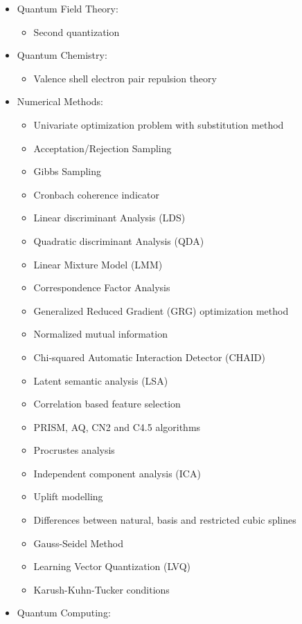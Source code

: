 \begin{itemize}
		\item Quantum Field Theory:
			\begin{itemize}
				\item Second quantization
			\end{itemize}
		\item Quantum Chemistry:
			\begin{itemize}
				\item Valence shell electron pair repulsion theory
			\end{itemize}
		\item Numerical Methods: 
			\begin{itemize}
				\item Univariate optimization problem with substitution method		
				\item Acceptation/Rejection Sampling
				\item Gibbs Sampling
				\item Cronbach coherence indicator
				\item Linear discriminant Analysis (LDS)
				\item Quadratic discriminant Analysis (QDA)
				\item Linear Mixture Model (LMM)
				\item Correspondence Factor Analysis
				\item Generalized Reduced Gradient (GRG) optimization method
				\item Normalized mutual information
				\item Chi-squared Automatic Interaction Detector (CHAID)
				\item Latent semantic analysis (LSA)
				\item Correlation based feature selection
				\item PRISM, AQ, CN2 and C4.5 algorithms
				\item Procrustes analysis
				\item Independent component analysis (ICA)
				\item Uplift modelling
				\item Differences between natural, basis and restricted cubic splines
				\item Gauss-Seidel Method
				\item Learning Vector Quantization (LVQ)
				\item Karush-Kuhn-Tucker conditions
			\end{itemize}
		\item Quantum Computing: 
			\begin{itemize}

\end{itemize}
\end{itemize}

